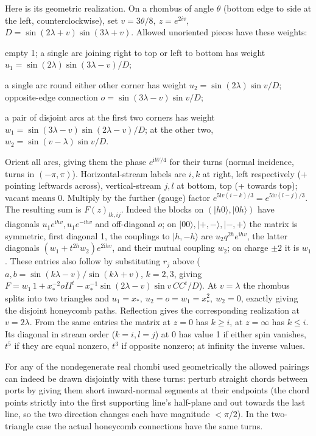 Here is its geometric realization. On a rhombus of angle \(\theta\) (bottom edge to side at the left, counterclockwise), set \(v=3\theta/8,\ z=e^{2iv}\), \(D=\sin(2\lambda+v)\sin(3\lambda+v)\). Allowed unoriented pieces have these weights:
\par\noindent\textbullet\quad empty 1; a single arc joining right to top or left to bottom has weight \(u_1=\sin(2\lambda)\sin(3\lambda-v)/D\);
\par\noindent\textbullet\quad a single arc round either other corner has weight \(u_2=\sin(2\lambda)\sin v/D\); opposite-edge connection \(o=\sin(3\lambda-v)\sin v/D\);
\par\noindent\textbullet\quad a pair of disjoint arcs at the first two corners has weight \(w_1=\sin(3\lambda-v)\sin(2\lambda-v)/D\); at the other two, \(w_2=\sin(v-\lambda)\sin v/D\).

Orient all arcs, giving them the phase \(e^{\mathrm i W/4}\) for their turns (normal incidence, turns in \((-\pi,\pi)\)). Horizontal-stream labels are \(i,k\) at right, left respectively (+ pointing leftwards across), vertical-stream \(j,l\) at bottom, top (+ towards top); vacant means 0. Multiply by the further (gauge) factor \(e^{5\mathrm i v(i-k)/3}=e^{5\mathrm i v(l-j)/3}\). The resulting sum is \(F(z)_{l k,i j}\). Indeed the blocks on \((|h0\rangle,|0h\rangle)\) have diagonals \(u_1 e^{\mathrm i hv},u_1 e^{-\mathrm i hv}\) and off-diagonal \(o\); on \(|00\rangle,|+,-\rangle,|-,+\rangle\) the matrix is symmetric, first diagonal 1, the couplings to \(|h,-h\rangle\) are \(u_2 q^{2h}e^{\mathrm i hv}\), the latter diagonals \((w_1+t^{2h}w_2)e^{2\mathrm i hv}\), and their mutual coupling \(w_2\); on charge \(\pm2\) it is \(w_1\). These entries also follow by substituting \(r_j\) above (\(a,b=\sin(k\lambda-v)/\sin(k\lambda+v)\), \(k=2,3\), giving
\(F=w_1\,1+x_*^{-2} o II^t-x_*^{-1}\sin(2\lambda-v)\sin v\, CC^t/D\)). At \(v=\lambda\) the rhombus splits into two triangles and \(u_1=x_*,\ u_2=o=w_1=x_*^2,\ w_2=0\), exactly giving the disjoint honeycomb paths. Reflection gives the corresponding realization at \(v=2\lambda\). From the same entries the matrix at \(z=0\) has \(k\ge i\), at \(z=\infty\) has \(k\le i\). Its diagonal in stream order (\(k=i,l=j\)) at 0 has value 1 if either spin vanishes, \(t^5\) if they are equal nonzero, \(t^3\) if opposite nonzero; at infinity the inverse values.



For any of the nondegenerate real rhombi used geometrically the allowed pairings can indeed be drawn disjointly with these turns: perturb straight chords between ports by giving them short inward-normal segments at their endpoints (the chord points strictly into the first supporting line's half-plane and out towards the last line, so the two direction changes each have magnitude \(<\pi/2\)). In the two-triangle case the actual honeycomb connections have the same turns.

